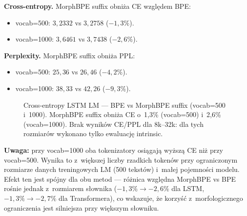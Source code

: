 \textbf{Cross-entropy.} MorphBPE suffix obniża CE względem BPE:
\begin{itemize}
  \item vocab=500: $3{,}2332$ vs $3{,}2758$ ($-1{,}3\%$).
  \item vocab=1000: $3{,}6461$ vs $3{,}7438$ ($-2{,}6\%$).
\end{itemize}

\textbf{Perplexity.} MorphBPE suffix obniża PPL:
\begin{itemize}
  \item vocab=500: $25{,}36$ vs $26{,}46$ ($-4{,}2\%$).
  \item vocab=1000: $38{,}33$ vs $42{,}26$ ($-9{,}3\%$).
\end{itemize}

\begin{figure}[h]
  \centering
  \caption{Cross-entropy LSTM LM --- BPE vs MorphBPE suffix (vocab=500 i~1000).
  MorphBPE suffix obniża CE o~1{,}3\% (vocab=500) i~2{,}6\% (vocab=1000).
  Brak wyników CE/PPL dla 8k--32k: dla tych rozmiarów wykonano tylko ewaluację intrinsic.}
  \label{fig:ce}
\end{figure}

\textbf{Uwaga:} przy vocab=1000 oba tokenizatory osiągają wyższą CE
niż przy vocab=500. Wynika to z~większej liczby rzadkich tokenów
przy ograniczonym rozmiarze danych treningowych LM (500 tekstów)
i~małej pojemności modelu. Efekt ten jest spójny
dla obu metod --- różnica względna MorphBPE vs BPE rośnie jednak
z~rozmiarem słownika ($-1{,}3\% \to -2{,}6\%$ dla LSTM,
$-1{,}3\% \to -2{,}7\%$ dla Transformera), co wskazuje,
że korzyść z~morfologicznego ograniczenia jest silniejsza
przy większym słowniku.

